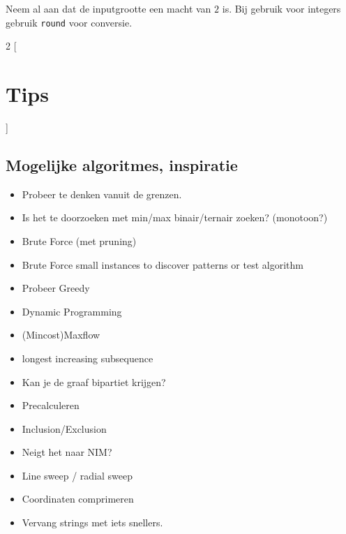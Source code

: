\documentclass[10pt,a4paper,titlepage]{article}
\begin{document}
Neem al aan dat de inputgrootte een macht van $2$ is. Bij gebruik voor integers  gebruik \verb-round- voor conversie.


\fi

\begin{multicols}{2}
[
\section{Tips}
]
\subsection{Mogelijke algoritmes, inspiratie}
\begin{itemize}[noitemsep,nolistsep]
\item Probeer te denken vanuit de grenzen. 
\item Is het te doorzoeken met min/max binair/ternair zoeken? (monotoon?)
\item Brute Force (met pruning)
\item Brute Force small instances to discover patterns or test algorithm
\item Probeer Greedy
\item Dynamic Programming
\item (Mincost)Maxflow
\item longest increasing subsequence
\item Kan je de graaf bipartiet krijgen?
\item Precalculeren
\item Inclusion/Exclusion
\item Neigt het naar NIM?
\item Line sweep / radial sweep
\item Coordinaten comprimeren
\item Vervang strings met iets snellers.
\end{itemize}
\end{multicols}
\end{document}
